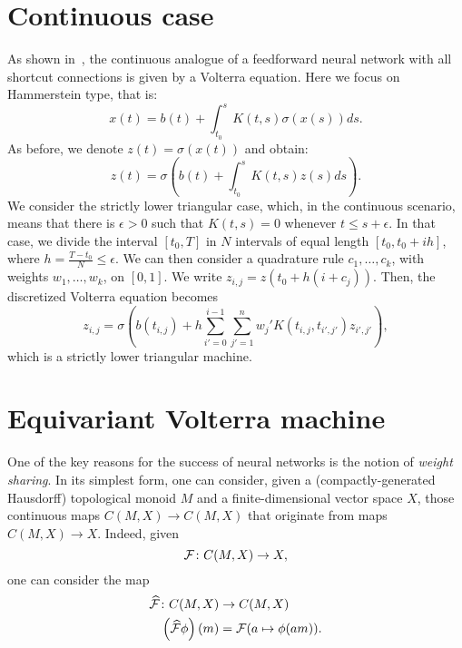 \documentclass[12pt]{article}
\begin{document}
\section{Continuous case}

As shown in~\cite{2020arXiv200702777V}, the continuous analogue of a feedforward neural network with all shortcut connections is given by a Volterra equation. Here we focus on Hammerstein type, that is:
\begin{equation*}
    x(t) = b(t) + \int_{t_0}^s K(t, s)\sigma(x(s)) ds.
\end{equation*}
As before, we denote $z(t) = \sigma(x(t))$ and obtain:
\begin{equation*}
    z(t) = \sigma\left(b(t) + \int_{t_0}^s K(t, s)z(s) ds\right).
\end{equation*}
We consider the strictly lower triangular case, which, in the continuous scenario, means that there is $\epsilon > 0$ such that $K(t, s) = 0$ whenever $t \le s + \epsilon$. In that case, we divide the interval $[t_0, T]$ in $N$ intervals of equal length $[t_0, t_0 + ih]$, where $h = \frac{T-t_0}{N} \le \epsilon$.
We can then consider a quadrature rule $c_1,\dots, c_k$, with weights $w_1, \dots, w_k$, on $[0, 1]$. We write $z_{i, j} = z(t_0 + h(i + c_j))$. Then, the discretized Volterra equation becomes
\begin{equation*}
    z_{i, j} = \sigma\left(b(t_{i, j}) + h\sum_{i' = 0}^{i-1} \sum_{j' = 1}^n w_j' K(t_{i, j}, t_{i', j'}) z_{i', j'}\right),
\end{equation*}
which is a strictly lower triangular machine.

\section{Equivariant Volterra machine}

One of the key reasons for the success of neural networks is the notion of {\em weight sharing}. In its simplest form, one can consider, given a (compactly-generated Hausdorff) topological monoid $M$ and a finite-dimensional vector space $X$, those continuous maps $C(M, X) \rightarrow C(M, X)$ that originate from maps $C(M, X) \rightarrow X$. Indeed, given
\begin{equation*}
    {\cal F} \colon C(M, X) \rightarrow X,
\end{equation*}
one can consider the map
\begin{align*}
    \widehat{\cal F} \colon C(M, X)       & \rightarrow C(M, X)              \\
    \left(\widehat{\cal F}\phi\right)(m) & = {\cal F}(a \mapsto \phi(am)).
\end{align*}
\end{document}
